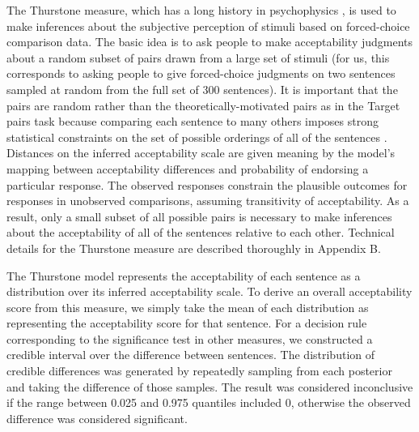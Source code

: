 \documentclass[doc]{apa6}
\newcommand{\targchoice}{{\sc Target pairs}}
\newcommand{\thurstone}{{\sc Thurstone}}
\begin{document}
The \thurstone{} measure, which has a long history in psychophysics \citep{thurstone1927lawofcomparativejudgment,roberts1999thurstonelikertvaliditycomparison,sage2010encyclopediaofmeasurement}, is used to make inferences about the subjective perception of stimuli based on forced-choice comparison data.
The basic idea is to ask people to make acceptability judgments about a random subset of pairs drawn from a large set of stimuli (for us, this corresponds to asking people to give forced-choice judgments on two sentences sampled at random from the full set of 300 sentences). It is important that the pairs are random rather than the theoretically-motivated pairs as in the \targchoice{} task because comparing each sentence to many others imposes strong statistical constraints on the set of possible orderings of all of the sentences \citep{thurstone1927lawofcomparativejudgment}. Distances on the inferred acceptability scale are given meaning by the model's mapping between acceptability differences and probability of endorsing a particular response. The observed responses constrain the plausible outcomes for responses in unobserved comparisons, assuming transitivity of acceptability. As a result, only a small subset of all possible pairs is necessary to make inferences about the acceptability of all of the sentences relative to each other. Technical details for the \thurstone{} measure are described thoroughly in Appendix B.

The \thurstone{} model represents the acceptability of each sentence as a distribution over its inferred acceptability scale. To derive an overall acceptability score from this measure, we simply take the mean of each distribution as representing the acceptability score for that sentence.
For a decision rule corresponding to the significance test in other measures, we constructed a credible interval over the difference between sentences. The distribution of credible differences was generated by repeatedly sampling from each posterior and taking the difference of those samples. The result was considered inconclusive if the range between 0.025 and 0.975 quantiles included 0, otherwise the observed difference was considered significant.
\end{document}
